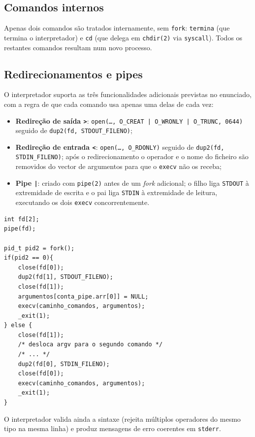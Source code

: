 \documentclass[11pt,a4paper]{article}
\begin{document}
\subsection{Comandos internos}

Apenas dois comandos são tratados internamente, sem \texttt{fork}: \texttt{termina} (que termina o interpretador) e \texttt{cd} (que delega em \texttt{chdir(2)} via \texttt{syscall}). Todos os restantes comandos resultam num novo processo.

\subsection{Redirecionamentos e pipes}

O interpretador suporta as três funcionalidades adicionais previstas no enunciado, com a regra de que cada comando usa apenas uma delas de cada vez:

\begin{itemize}[leftmargin=1.5em]
    \item \textbf{Redireção de saída \texttt{>}}: \texttt{open(\dots, O\_CREAT | O\_WRONLY | O\_TRUNC, 0644)} seguido de \texttt{dup2(fd, STDOUT\_FILENO)};
    \item \textbf{Redireção de entrada \texttt{<}}: \texttt{open(\dots, O\_RDONLY)} seguido de \texttt{dup2(fd, STDIN\_FILENO)}; após o redirecionamento o operador e o nome do ficheiro são removidos do vector de argumentos para que o \texttt{execv} não os receba;
    \item \textbf{Pipe \texttt{|}}: criado com \texttt{pipe(2)} antes de um \textit{fork} adicional; o filho liga \texttt{STDOUT} à extremidade de escrita e o pai liga \texttt{STDIN} à extremidade de leitura, executando os dois \texttt{execv} concorrentemente.
\end{itemize}

\begin{lstlisting}[style=cstyle,caption={Construção do pipe entre dois comandos}]
int fd[2];
pipe(fd);

pid_t pid2 = fork();
if(pid2 == 0){
    close(fd[0]);
    dup2(fd[1], STDOUT_FILENO);
    close(fd[1]);
    argumentos[conta_pipe.arr[0]] = NULL;
    execv(caminho_comandos, argumentos);
    _exit(1);
} else {
    close(fd[1]);
    /* desloca argv para o segundo comando */
    /* ... */
    dup2(fd[0], STDIN_FILENO);
    close(fd[0]);
    execv(caminho_comandos, argumentos);
    _exit(1);
}
\end{lstlisting}

O interpretador valida ainda a sintaxe (rejeita múltiplos operadores do mesmo tipo na mesma linha) e produz mensagens de erro coerentes em \texttt{stderr}.
\end{document}
